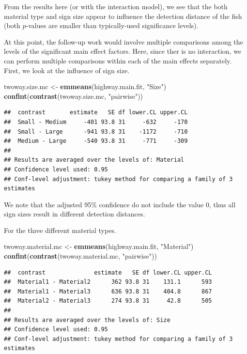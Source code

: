 \documentclass[
]{book}
\newenvironment{Shaded}{\begin{snugshade}}{\end{snugshade}}
\newcommand{\FunctionTok}[1]{\textcolor[rgb]{0.13,0.29,0.53}{\textbf{#1}}}
\newcommand{\NormalTok}[1]{#1}
\newcommand{\OtherTok}[1]{\textcolor[rgb]{0.56,0.35,0.01}{#1}}
\newcommand{\StringTok}[1]{\textcolor[rgb]{0.31,0.60,0.02}{#1}}
\begin{document}
From the results here (or with the interaction model), we see that the both material type and sign size appear to influence the detection distance of the fish (both \(p\)-values are smaller than typically-used significance levels).

At this point, the follow-up work would involve multiple comparisons among the levels of the significant main effect factors.
Here, since ther is no interaction, we can perform multiple comparisons within each of the main effects separately.
First, we look at the influence of sign size.

\begin{Shaded}
\begin{Highlighting}[]
\NormalTok{twoway.size.mc }\OtherTok{\textless{}{-}} \FunctionTok{emmeans}\NormalTok{(highway.main.fit, }\StringTok{"Size"}\NormalTok{)}
\FunctionTok{confint}\NormalTok{(}\FunctionTok{contrast}\NormalTok{(twoway.size.mc, }\StringTok{"pairwise"}\NormalTok{))}
\end{Highlighting}
\end{Shaded}

\begin{verbatim}
##  contrast       estimate   SE df lower.CL upper.CL
##  Small - Medium     -401 93.8 31     -632     -170
##  Small - Large      -941 93.8 31    -1172     -710
##  Medium - Large     -540 93.8 31     -771     -309
## 
## Results are averaged over the levels of: Material 
## Confidence level used: 0.95 
## Conf-level adjustment: tukey method for comparing a family of 3 estimates
\end{verbatim}

We note that the adjusted 95\% confidence do not include the value 0, thus all sign sizes result in different detection distances.

For the three different material types.

\begin{Shaded}
\begin{Highlighting}[]
\NormalTok{twoway.material.mc }\OtherTok{\textless{}{-}} \FunctionTok{emmeans}\NormalTok{(highway.main.fit, }\StringTok{"Material"}\NormalTok{)}
\FunctionTok{confint}\NormalTok{(}\FunctionTok{contrast}\NormalTok{(twoway.material.mc, }\StringTok{"pairwise"}\NormalTok{))}
\end{Highlighting}
\end{Shaded}

\begin{verbatim}
##  contrast              estimate   SE df lower.CL upper.CL
##  Material1 - Material2      362 93.8 31    131.1      593
##  Material1 - Material3      636 93.8 31    404.8      867
##  Material2 - Material3      274 93.8 31     42.8      505
## 
## Results are averaged over the levels of: Size 
## Confidence level used: 0.95 
## Conf-level adjustment: tukey method for comparing a family of 3 estimates
\end{verbatim}
\end{document}
